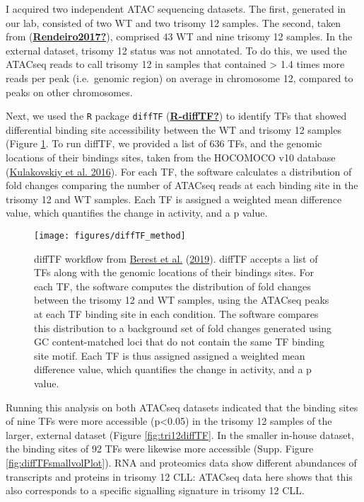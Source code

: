 \documentclass[11pt, a4paper, twosided]{book}
\begin{document}
I acquired two independent ATAC sequencing datasets. The first, generated in our lab, consisted of two WT and two trisomy 12 samples. The second, taken from (\protect\hyperlink{ref-Rendeiro2017}{\textbf{Rendeiro2017?}}), comprised 43 WT and nine trisomy 12 samples. In the external dataset, trisomy 12 status was not annotated. To do this, we used the ATACseq reads to call trisomy 12 in samples that contained \textgreater{} 1.4 times more reads per peak (i.e.~genomic region) on average in chromosome 12, compared to peaks on other chromosomes.

Next, we used the \texttt{R} package \texttt{diffTF} (\protect\hyperlink{ref-R-diffTF}{\textbf{R-diffTF?}}) to identify TFs that showed differential binding site accessibility between the WT and trisomy 12 samples (Figure \ref{fig:diffTFexplainer}. To run diffTF, we provided a list of 636 TFs, and the genomic locations of their bindings sites, taken from the HOCOMOCO v10 database (\protect\hyperlink{ref-HOCOMOCO}{Kulakovskiy et al. 2016}). For each TF, the software calculates a distribution of fold changes comparing the number of ATACseq reads at each binding site in the trisomy 12 and WT samples. Each TF is assigned a weighted mean difference value, which quantifies the change in activity, and a p value.


\begin{figure}

{\centering \texttt{[image: figures/diffTF\_method]} 

}

\caption{diffTF workflow from \protect\hyperlink{ref-Berest2019}{Berest et al.} (\protect\hyperlink{ref-Berest2019}{2019}). diffTF accepts a list of TFs along with the genomic locations of their bindings sites. For each TF, the software computes the distribution of fold changes between the trisomy 12 and WT samples, using the ATACseq peaks at each TF binding site in each condition. The software compares this distribution to a background set of fold changes generated using GC content-matched loci that do not contain the same TF binding site motif. Each TF is thus assigned assigned a weighted mean difference value, which quantifies the change in activity, and a p value.}\label{fig:diffTFexplainer}
\end{figure}
Running this analysis on both ATACseq datasets indicated that the binding sites of nine TFs were more accessible (p\textless0.05) in the trisomy 12 samples of the larger, external dataset (Figure \ref{fig:tri12diffTF}. In the smaller in-house dataset, the binding sites of 92 TFs were likewise more accessible (Supp. Figure \ref{fig:diffTFsmallvolPlot}). RNA and proteomics data show different abundances of transcripts and proteins in trisomy 12 CLL: ATACseq data here shows that this also corresponds to a specific signalling signature in trisomy 12 CLL.
\end{document}
